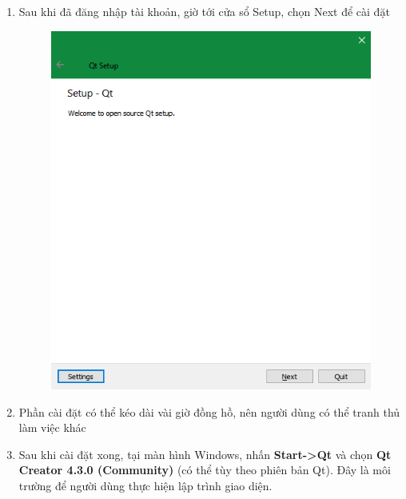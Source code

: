 \documentclass[12pt,a4paper]{report}
\begin{document}
\begin{enumerate}
\begin{figure}[H]
                \end{figure}
                \item Sau khi đã đăng nhập tài khoản, giờ tới cửa sổ Setup, chọn Next để cài đặt
                \begin{figure}[H]
                    \centering
                    \label{F:qtstep6}
                    \includegraphics[scale = .7]{Qtstep6.png}
                \end{figure}
                \item Phần cài đặt có thể kéo dài vài giờ đồng hồ, nên người dùng có thể tranh thủ làm việc khác
                \item Sau khi cài đặt xong, tại màn hình Windows, nhấn \textbf{Start->Qt} và chọn \textbf{Qt Creator 4.3.0 (Community)} (có thể tùy theo phiên bản Qt). Đây là môi trường để người dùng thực hiện lập trình giao diện.
                \begin{figure}[H]
                    \centering
                    \label{F:qtstep7}

\end{figure}
\end{enumerate}
\end{document}
